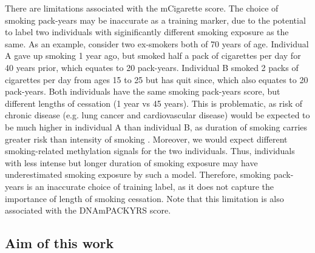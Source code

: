 \documentclass{article}
\begin{document}
There are limitations associated with the mCigarette score. The choice of smoking pack-years may be inaccurate as a training marker, due to the potential to label two individuals with siginificantly different smoking exposure as the same. As an example, consider two ex-smokers both of 70 years of age. Individual A gave up smoking 1 year ago, but smoked half a pack of cigarettes per day for 40 years prior, which equates to 20 pack-years. Individual B smoked 2 packs of cigarettes per day from ages 15 to 25 but has quit since, which also equates to 20 pack-years. Both individuals have the same smoking pack-years score, but different lengths of cessation (1 year vs 45 years). This is problematic, as risk of chronic disease (e.g. lung cancer and cardiovascular disease) would be expected to be much higher in individual A than individual B, as duration of smoking carries greater risk than intensity of smoking \cite{potter2024pack}. Moreover, we would expect different smoking-related methylation signals for the two individuals. Thus, individuals with less intense but longer duration of smoking exposure may have underestimated smoking exposure by such a model. Therefore, smoking pack-years is an inaccurate choice of training label, as it does not capture the importance of length of smoking cessation. Note that this limitation is also associated with the DNAmPACKYRS score.


\subsection{Aim of this work}
\end{document}
